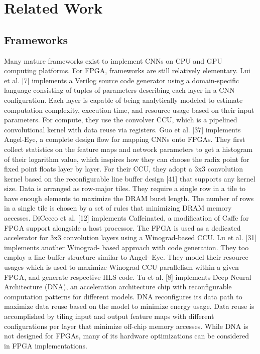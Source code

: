 \chapter{Related Work}

\section{Frameworks}
Many mature frameworks exist to implement CNNs on CPU and GPU computing platforms. For FPGA, frameworks are still relatively elementary. Lui et al. [7] implements a Verilog source code generator using a domain-specific language consisting of tuples of parameters describing each layer in a CNN configuration. Each layer is capable of being analytically modeled to estimate computation complexity, execution time, and resource usage based on their input parameters. For compute, they use the convolver CCU, which is a pipelined convolutional kernel with data reuse via registers. Guo et al. [37] implements Angel-Eye, a complete design flow for mapping CNNs onto FPGAs. They first collect statistics on the feature maps and network parameters to get a histogram of their logarithm value, which inspires how they can choose the radix point for fixed point floats layer by layer. For their CCU, they adopt a 3x3 convolution kernel based on the reconfigurable line buffer design [41] that supports any kernel size. Data is arranged as row-major tiles. They require a single row in a tile to have enough elements to maximize the DRAM burst length. The number of rows in a single tile is chosen by a set of rules that minimizing DRAM memory accesses. DiCecco et al. [12] implements Caffeinated, a modification of Caffe for FPGA support alongside a host processor. The FPGA is used as a dedicated accelerator for 3x3 convolution layers using a Winograd-based CCU. Lu et al. [31] implements another Winograd- based approach with code generation. They too employ a line buffer structure similar to Angel- Eye. They model their resource usages which is used to maximize Winograd CCU parallelism within a given FPGA, and generate respective HLS code. Tu et al. [8] implements Deep Neural Architecture (DNA), an acceleration architecture chip with reconfigurable computation patterns for different models. DNA reconfigures its data path to maximize data reuse based on the model to minimize energy usage. Data reuse is accomplished by tiling input and output feature maps with different configurations per layer that minimize off-chip memory accesses. While DNA is not designed for FPGAs, many of its hardware optimizations can be considered in FPGA implementations.

